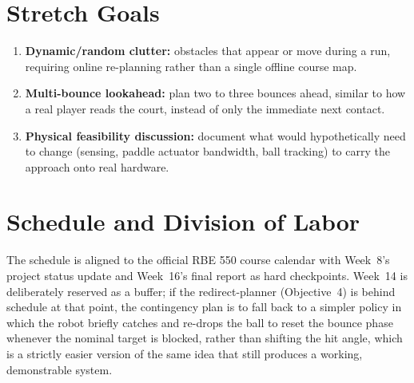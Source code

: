 \documentclass[10pt,twocolumn]{article}
\begin{document}
\section{Stretch Goals}
\begin{enumerate}[nosep]
  \item \textbf{Dynamic/random clutter:} obstacles that appear or move
  during a run, requiring online re-planning rather than a single offline
  course map.
  \item \textbf{Multi-bounce lookahead:} plan two to three bounces ahead,
  similar to how a real player reads the court, instead of only the
  immediate next contact.
  \item \textbf{Physical feasibility discussion:} document what would 
  hypothetically need to change (sensing, paddle actuator bandwidth, 
  ball tracking) to carry the approach onto real hardware.
\end{enumerate}

\section{Schedule and Division of Labor}
The schedule is aligned to the official RBE 550 course calendar with
Week~8's project status update and Week~16's final report as hard
checkpoints. Week~14 is deliberately reserved as a buffer; if the
redirect-planner (Objective~4) is behind schedule at that point, the
contingency plan is to fall back to a simpler policy in which the robot
briefly catches and re-drops the ball to reset the bounce phase whenever
the nominal target is blocked, rather than shifting the hit angle, which is a
strictly easier version of the same idea that still produces a working,
demonstrable system.
\end{document}
